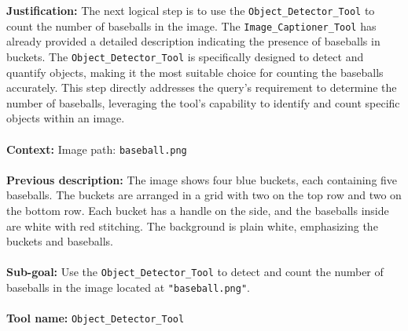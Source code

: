 \begin{plannerbox}

\textbf{Justification:}
The next logical step is to use the \texttt{Object\_Detector\_Tool} to count the number of baseballs in the image. The \texttt{Image\_Captioner\_Tool} has already provided a detailed description indicating the presence of baseballs in buckets. The \texttt{Object\_Detector\_Tool} is specifically designed to detect and quantify objects, making it the most suitable choice for counting the baseballs accurately. This step directly addresses the query's requirement to determine the number of baseballs, leveraging the tool's capability to identify and count specific objects within an image.
\\\\
\textbf{Context:}
Image path: \texttt{baseball.png}
\\\\
\textbf{Previous description:}
The image shows four blue buckets, each containing five baseballs. The buckets are arranged in a grid with two on the top row and two on the bottom row. Each bucket has a handle on the side, and the baseballs inside are white with red stitching. The background is plain white, emphasizing the buckets and baseballs.
\\\\
\textbf{Sub-goal:}
Use the \texttt{Object\_Detector\_Tool} to detect and count the number of baseballs in the image located at \texttt{"baseball.png"}.
\\\\
\textbf{Tool name:} \texttt{Object\_Detector\_Tool}
\end{plannerbox}


